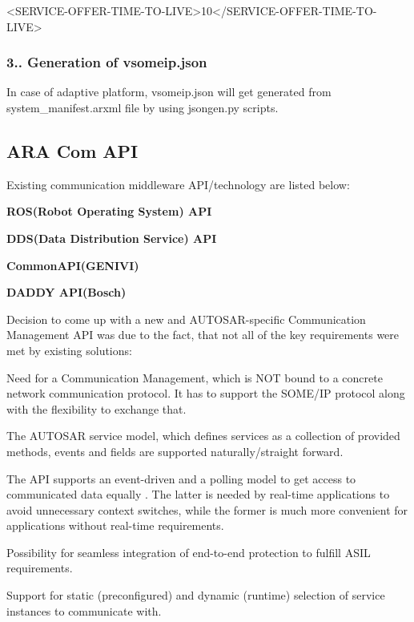 \begin{DoxyCode}
<\textcolor{keywordtype}{SERVICE-OFFER-TIME-TO-LIVE}>10</\textcolor{keywordtype}{SERVICE-OFFER-TIME-TO-LIVE}>
\end{DoxyCode}
 \subsubsection*{3.. Generation of vsomeip.\+json}


\begin{DoxyItemize}
\item In case of adaptive platform, vsomeip.\+json will get generated from system\+\_\+manifest.\+arxml file by using jsongen.\+py scripts.
\end{DoxyItemize}

\hypertarget{adaptive_communicationmanagement_aracom}{}\subsection{A\+RA Com A\+PI}\label{adaptive_communicationmanagement_aracom}

\begin{DoxyItemize}
\item Existing communication middleware A\+P\+I/technology are listed below\+:
\begin{DoxyItemize}
\item {\bfseries R\+O\+S(\+Robot Operating System) A\+PI}
\item {\bfseries D\+D\+S(\+Data Distribution Service) A\+PI}
\item {\bfseries Common\+A\+P\+I(\+G\+E\+N\+I\+V\+I)}
\item {\bfseries D\+A\+D\+DY A\+P\+I(\+Bosch)}
\end{DoxyItemize}
\item Decision to come up with a new and A\+U\+T\+O\+S\+A\+R-\/specific Communication Management A\+PI was due to the fact, that not all of the key requirements were met by existing solutions\+:
\begin{DoxyItemize}
\item Need for a Communication Management, which is N\+OT bound to a concrete network communication protocol. It has to support the S\+O\+M\+E/\+IP protocol along with the flexibility to exchange that.
\item The A\+U\+T\+O\+S\+AR service model, which defines services as a collection of provided methods, events and fields are supported naturally/straight forward.
\item The A\+PI supports an event-\/driven and a polling model to get access to communicated data equally . The latter is needed by real-\/time applications to avoid unnecessary context switches, while the former is much more convenient for applications without real-\/time requirements.
\item Possibility for seamless integration of end-\/to-\/end protection to fulfill A\+S\+IL requirements.
\item Support for static (preconfigured) and dynamic (runtime) selection of service instances to communicate with.
\end{DoxyItemize}
\end{DoxyItemize}

